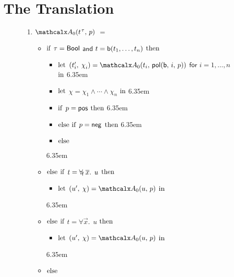 \section{The Translation}
\label{sec:encoding}

\newcommand{\itemx}{\itemindent6.35em\item}

\begin{figure}[t]
\normalsize
\begin{enumerate}
\itemx[\ ]
$\conv_0( t\typ{\tau},\, p )$ $=$
 \begin{itemize}
   \itemx[] $\textrm{if}$ $\tau = \mathsf{Bool}$ $\mathsf{and}$ $t = \mathsf{b}(t_1,\dotsc,t_n)$ $\textrm{then}$
    \begin{itemize}
      \itemx[] $\textrm{let}$ $( t'_i,\, \chi_i ) = \conv_0( t_i,\, \pol( \boolop,\, i,\, p ) )$ $\mathsf{for}$ $i = 1, \dotsc, n$ $\textrm{in}$%
      \itemx[] $\textrm{let}$ $\chi = \chi_1 \wedge \cdots \wedge \chi_n$ $\textrm{in}$
      \itemx[] $\textrm{if}$ $p = \mathsf{pos}$ $\textrm{then}$ 
      \itemx[] $\textrm{else}$ $\textrm{if}$ $p = \mathsf{neg}$ $\textrm{then}$ 
      \itemx[] $\textrm{else}$ 
    \end{itemize}
  \itemx[] $\textrm{else}$ $\textrm{if}$ $t = \forall_{\!\mathsf{f}\:} \overline{x}.\;\, u$ $\textrm{then}$
    \begin{itemize}
      \itemx[] $\textrm{let}$ $( u',\, \chi ) = \conv_0( u,\, p )$ $\textrm{in}$ 
    \end{itemize}
  \itemx[] $\textrm{else}$ $\textrm{if}$ $t = \forall \vec x.\;\, u$ $\textrm{then}$
    \begin{itemize}
      \itemx[] $\textrm{let}$ $( u',\, \chi ) = \conv_0( u,\, p )$ $\textrm{in}$ 
    \end{itemize}
   \itemx[] $\textrm{else}$
   \begin{itemize}

\end{itemize}
\end{itemize}
\end{enumerate}
\end{figure}
